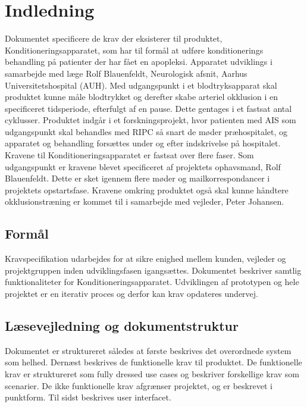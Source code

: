 	\chapter{Indledning}
	Dokumentet specificere de krav der eksisterer til produktet, Konditioneringsapparatet, som har til formål at udføre konditionerings behandling på patienter der har fået en apopleksi. Apparatet udviklings i samarbejde med læge Rolf Blauenfeldt, Neurologisk afsnit, Aarhus Universitetshospital (AUH). Med udgangspunkt i et blodtryksapparat skal produktet kunne måle blodtrykket og derefter skabe arteriel okklusion i en specificeret tidsperiode, efterfulgt af en pause. Dette gentages i et fastsat antal cyklusser. Produktet indgår i et forskningsprojekt, hvor patienten med AIS som udgangspunkt skal behandles med RIPC så snart de møder præhospitalet, og apparatet og behandling forsættes under og efter indskrivelse på hospitalet. 
	Kravene til Konditioneringsapparatet er fastsat over flere faser. Som udgangspunkt er kravene blevet specificeret af projektets ophavsmand, Rolf Blauenfeldt. Dette er sket igennem flere møder og mailkorrespondancer i projektets opstartsfase. Kravene omkring produktet også skal kunne håndtere okklusionstræning er kommet til i samarbejde med vejleder, Peter Johansen. 
	
	\section{Formål}
	Kravspecifikation udarbejdes for at sikre enighed mellem kunden, vejleder og projektgruppen inden udviklingsfasen igangsættes. Dokumentet beskriver samtlig funktionaliteter for Konditioneringsapparatet. Udviklingen af prototypen og hele projektet er en iterativ proces og derfor kan krav opdateres undervej. 
	
	\section{Læsevejledning og dokumentstruktur}
	Dokumentet er struktureret således at første beskrives det overordnede system som helhed. Dernæst beskrives de funktionelle krav til produktet. De funktionelle krav er struktureret som fully dressed use cases og beskriver forskellige krav som scenarier. De ikke funktionelle krav afgrænser projektet, og er beskrevet i punktform. Til sidst beskrives user interfacet. 
	
	\newpage

